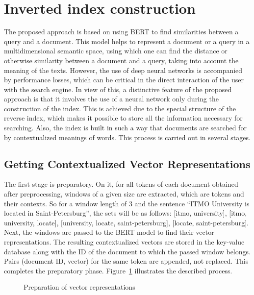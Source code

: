 \documentclass[
    twocolumn,
]{template/ceurart}
\begin{document}
    \section{Inverted index construction}
    The proposed approach is based on using BERT to find similarities between a query and a document.
    This model helps to represent a document or a query in a multidimensional semantic space,
    using which one can find the distance or otherwise similarity between a document and a query,
    taking into account the meaning of the texts.
    However, the use of deep neural networks is accompanied by performance losses,
    which can be critical in the direct interaction of the user with the search engine.
    In view of this, a distinctive feature of the proposed approach is that it involves the use of a neural network
    only during the construction of the index.
    This is achieved due to the special structure of the reverse index,
    which makes it possible to store all the information necessary for searching.
    Also, the index is built in such a way that documents are searched for by contextualized meanings of words.
    This process is carried out in several stages.

    \subsection{Getting Contextualized Vector Representations}
    The first stage is preparatory.
    On it, for all tokens of each document obtained after preprocessing,
    windows of a given size are extracted, which are tokens and their contexts.
    So for a window length of 3 and the sentence ``ITMO University is located in Saint-Petersburg'',
    the sets will be as follows: [itmo, university], [itmo, university, locate],
    [university, locate, saint-petersburg], [locate, saint-petersburg].
    Next, the windows are passed to the BERT model to find their vector representations.
    The resulting contextualized vectors are stored in the key-value database
    along with the ID of the document to which the passed window belongs.
    Pairs (document ID, vector) for the same token are appended, not replaced.
    This completes the preparatory phase.
    Figure~\ref{fig:storeVectors} illustrates the described process.
    \begin{figure}
        \centering
        
        \caption{Preparation of vector representations}
        \label{fig:storeVectors}
    \end{figure}
    
\end{document}
